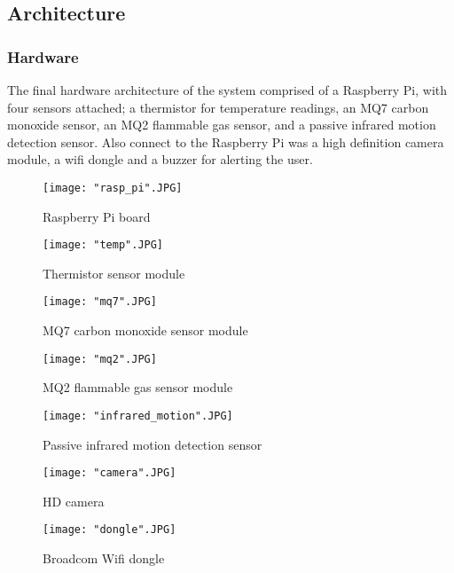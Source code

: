 \documentclass{article}
\begin{document}
\subsection{Architecture}

\subsubsection{Hardware}
The final hardware architecture of the system comprised of a Raspberry Pi, with four sensors attached; a thermistor for temperature readings, an MQ7 carbon monoxide sensor, an MQ2 flammable gas sensor, and a passive infrared motion detection sensor. Also connect to the Raspberry Pi was a high definition camera module, a wifi dongle and a buzzer for alerting the user.

\begin{figure}[H]
\centering
\texttt{[image: "rasp\_pi".JPG]}
\caption{Raspberry Pi board}
\label{fig:hard_rasp_pi}
\end{figure}

\begin{figure}[H]
\centering
\texttt{[image: "temp".JPG]}
\caption{Thermistor sensor module}
\label{fig:hard_temp}
\end{figure}

\begin{figure}[H]
\centering
\texttt{[image: "mq7".JPG]}
\caption{MQ7 carbon monoxide sensor module}
\label{fig:hard_mq7}
\end{figure}

\begin{figure}[H]
\centering
\texttt{[image: "mq2".JPG]}
\caption{MQ2 flammable gas sensor module}
\label{fig:hard_mq2}
\end{figure}

\begin{figure}[H]
\centering
\texttt{[image: "infrared\_motion".JPG]}
\caption{Passive infrared motion detection sensor}
\label{fig:hard_motion}
\end{figure}

\begin{figure}[H]
\centering
\texttt{[image: "camera".JPG]}
\caption{HD camera}
\label{fig:hard_camera}
\end{figure}

\begin{figure}[H]
\centering
\texttt{[image: "dongle".JPG]}
\caption{Broadcom Wifi dongle}
\label{fig:hard_camera}
\end{figure}
\end{document}
